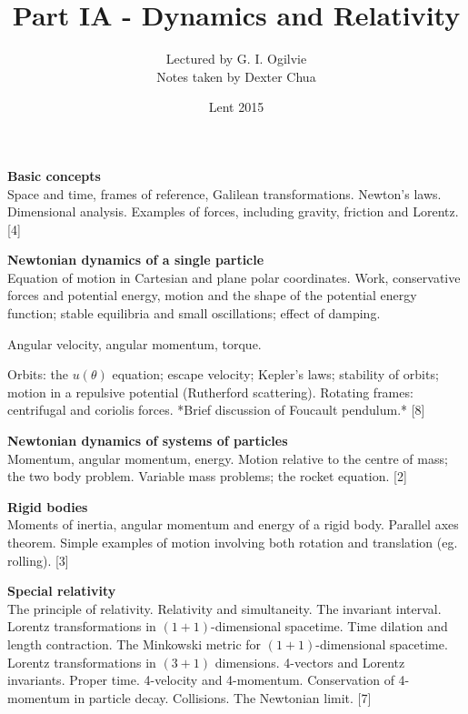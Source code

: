\documentclass[a4paper]{article}
\title{Part IA - Dynamics and Relativity}
\author{Lectured by G. I. Ogilvie\\\small Notes taken by Dexter Chua}
\date{Lent 2015}
\begin{document}
\maketitle
{\small
\noindent\textbf{Basic concepts}\\
Space and time, frames of reference, Galilean transformations. Newton's laws. Dimensional analysis.  Examples of forces, including gravity, friction and Lorentz.\hspace*{\fill} [4]

\vspace{10pt}
\noindent\textbf{Newtonian dynamics of a single particle}\\
Equation of motion in Cartesian and plane polar coordinates. Work, conservative forces and potential energy, motion and the shape of the potential energy function; stable equilibria and small oscillations; effect of damping.

\vspace{5pt}
\noindent Angular velocity, angular momentum, torque.

\vspace{5pt}
\noindent Orbits: the $u(\theta)$ equation; escape velocity; Kepler's laws; stability of orbits; motion in a repulsive potential (Rutherford scattering). Rotating frames: centrifugal and coriolis forces. *Brief discussion of Foucault pendulum.*\hspace*{\fill} [8]

\vspace{10pt}
\noindent\textbf{Newtonian dynamics of systems of particles}\\
Momentum, angular momentum, energy. Motion relative to the centre of mass; the two body problem.  Variable mass problems; the rocket equation.\hspace*{\fill} [2]

\vspace{10pt}
\noindent\textbf{Rigid bodies}\\
Moments of inertia, angular momentum and energy of a rigid body. Parallel axes theorem. Simple examples of motion involving both rotation and translation (eg. rolling).\hspace*{\fill} [3]

\vspace{10pt}
\noindent\textbf{Special relativity}\\
The principle of relativity. Relativity and simultaneity. The invariant interval. Lorentz transformations in $(1 + 1)$-dimensional spacetime. Time dilation and length contraction. The Minkowski metric for $(1 + 1)$-dimensional spacetime. Lorentz transformations in $(3 + 1)$ dimensions. 4-vectors and Lorentz invariants. Proper time. 4-velocity and 4-momentum. Conservation of 4-momentum in particle decay. Collisions. The Newtonian limit.\hspace*{\fill} [7]}
\end{document}

